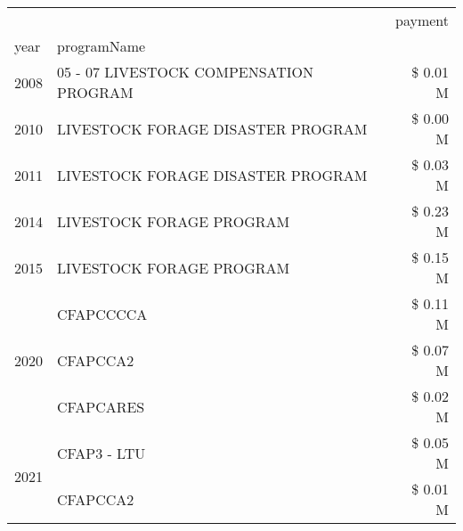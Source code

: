 \begin{tabular}{llr}
\toprule
 &  & payment \\
year & programName &  \\
\midrule
2008 & 05 - 07 LIVESTOCK COMPENSATION PROGRAM & \$ 0.01 M \\
\cline{1-3}
2010 & LIVESTOCK FORAGE DISASTER PROGRAM & \$ 0.00 M \\
\cline{1-3}
2011 & LIVESTOCK FORAGE DISASTER PROGRAM & \$ 0.03 M \\
\cline{1-3}
2014 & LIVESTOCK FORAGE PROGRAM & \$ 0.23 M \\
\cline{1-3}
2015 & LIVESTOCK FORAGE PROGRAM & \$ 0.15 M \\
\cline{1-3}
\multirow[t]{3}{*}{2020} & CFAPCCCCA & \$ 0.11 M \\
 & CFAPCCA2 & \$ 0.07 M \\
 & CFAPCARES & \$ 0.02 M \\
\cline{1-3}
\multirow[t]{2}{*}{2021} & CFAP3 - LTU & \$ 0.05 M \\
 & CFAPCCA2 & \$ 0.01 M \\
\cline{1-3}
\bottomrule
\end{tabular}
